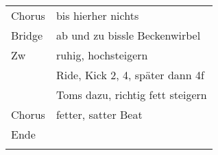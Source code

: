 
\begin{tabular}{ll}
	Chorus & bis hierher nichts \\
	Bridge & ab und zu bissle Beckenwirbel \\
	Zw     & ruhig, hochsteigern \\
	       & Ride, Kick 2, 4, später dann 4f \\
	       & Toms dazu, richtig fett steigern \\
	Chorus & fetter, satter Beat \\
	Ende   &  \\
	& \\
\end{tabular}